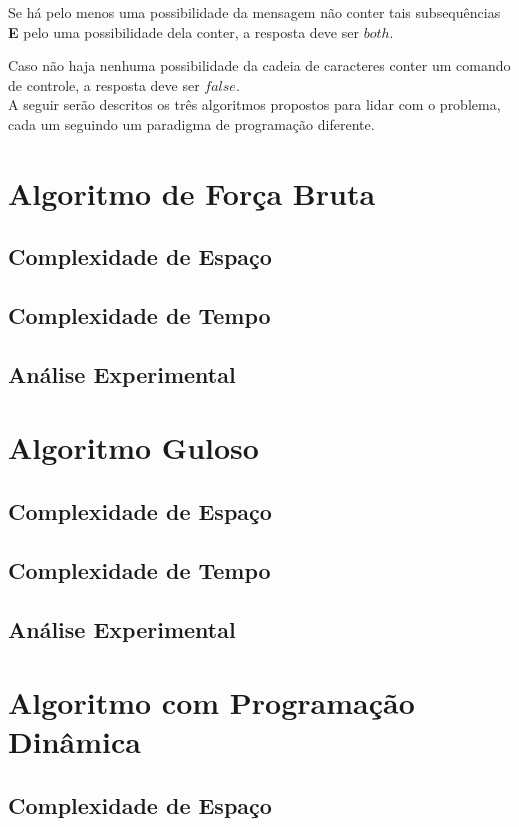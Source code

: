 \documentclass[a4paper,12pt,titlepage]{article}
\begin{document}
Se há pelo menos uma possibilidade da mensagem não conter tais subsequências \textbf{E} pelo uma possibilidade dela conter, a resposta deve ser $both$.

Caso não haja nenhuma possibilidade da cadeia de caracteres conter um comando de controle, a resposta deve ser $false$. \ \\

A seguir serão descritos os três algoritmos propostos para lidar com o problema, cada um seguindo um paradigma de programação diferente.

\section{Algoritmo de Força Bruta}


\subsection{Complexidade de Espaço}
\subsection{Complexidade de Tempo}
\subsection{Análise Experimental}

\section{Algoritmo Guloso}

\subsection{Complexidade de Espaço}
\subsection{Complexidade de Tempo}
\subsection{Análise Experimental}


\section{Algoritmo com Programação Dinâmica}

\subsection{Complexidade de Espaço}
\end{document}
